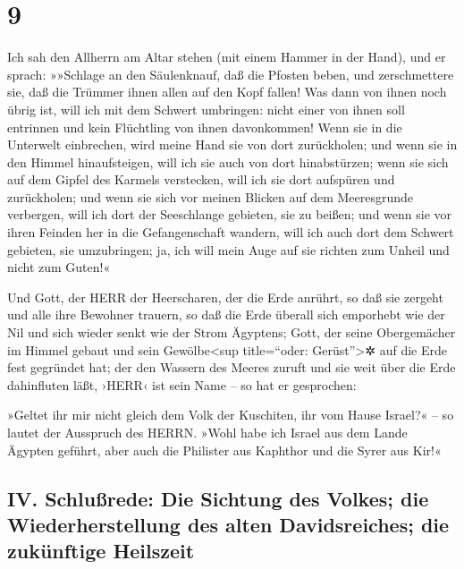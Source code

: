 \hypertarget{section-8}{%
\section{9}\label{section-8}}

Ich sah den Allherrn am Altar stehen (mit einem Hammer in
der Hand), und er sprach: »»Schlage an den Säulenknauf, daß die Pfosten
beben, und zerschmettere sie, daß die Trümmer ihnen allen auf den Kopf
fallen! Was dann von ihnen noch übrig ist, will ich mit dem Schwert
umbringen: nicht einer von ihnen soll entrinnen und kein Flüchtling von
ihnen davonkommen! Wenn sie in die Unterwelt einbrechen,
wird meine Hand sie von dort zurückholen; und wenn sie in den Himmel
hinaufsteigen, will ich sie auch von dort hinabstürzen;
wenn sie sich auf dem Gipfel des Karmels verstecken, will
ich sie dort aufspüren und zurückholen; und wenn sie sich vor meinen
Blicken auf dem Meeresgrunde verbergen, will ich dort der Seeschlange
gebieten, sie zu beißen; und wenn sie vor ihren Feinden
her in die Gefangenschaft wandern, will ich auch dort dem Schwert
gebieten, sie umzubringen; ja, ich will mein Auge auf sie richten zum
Unheil und nicht zum Guten!«

Und Gott, der HERR der Heerscharen, der die Erde anrührt,
so daß sie zergeht und alle ihre Bewohner trauern, so daß die Erde
überall sich emporhebt wie der Nil und sich wieder senkt wie der Strom
Ägyptens; Gott, der seine Obergemächer im Himmel gebaut
und sein Gewölbe\textless sup title=``oder: Gerüst''\textgreater✲ auf
die Erde fest gegründet hat; der den Wassern des Meeres zuruft und sie
weit über die Erde dahinfluten läßt, ›HERR‹ ist sein Name -- so hat er
gesprochen:

»Geltet ihr mir nicht gleich dem Volk der Kuschiten, ihr
vom Hause Israel?« -- so lautet der Ausspruch des HERRN. »Wohl habe ich
Israel aus dem Lande Ägypten geführt, aber auch die Philister aus
Kaphthor und die Syrer aus Kir!«

\hypertarget{iv.-schluuxdfrede-die-sichtung-des-volkes-die-wiederherstellung-des-alten-davidsreiches-die-zukuxfcnftige-heilszeit}{%
\subsection{IV. Schlußrede: Die Sichtung des Volkes; die
Wiederherstellung des alten Davidsreiches; die zukünftige
Heilszeit}\label{iv.-schluuxdfrede-die-sichtung-des-volkes-die-wiederherstellung-des-alten-davidsreiches-die-zukuxfcnftige-heilszeit}}

